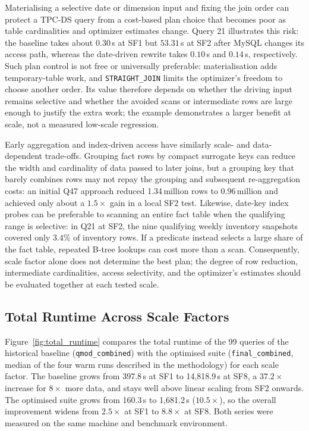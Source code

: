 \documentclass{ULBreport}
\begin{document}
Materialising a selective date or dimension input and fixing the join order can protect a TPC-DS query from a cost-based plan choice that becomes poor as table cardinalities and optimizer estimates change. Query 21 illustrates this risk: the baseline takes about $0.30$\,s at SF1 but $53.31$\,s at SF2 after MySQL changes its access path, whereas the date-driven rewrite takes $0.10$\,s and $0.14$\,s, respectively. Such plan control is not free or universally preferable: materialisation adds temporary-table work, and \texttt{STRAIGHT\_JOIN} limits the optimizer's freedom to choose another order. Its value therefore depends on whether the driving input remains selective and whether the avoided scans or intermediate rows are large enough to justify the extra work; the example demonstrates a larger benefit at scale, not a measured low-scale regression.

Early aggregation and index-driven access have similarly scale- and data-dependent trade-offs. Grouping fact rows by compact surrogate keys can reduce the width and cardinality of data passed to later joins, but a grouping key that barely combines rows may not repay the grouping and subsequent re-aggregation costs: an initial Q47 approach reduced 1.34\,million rows to 0.96\,million and achieved only about a $1.5\times$ gain in a local SF2 test. Likewise, date-key index probes can be preferable to scanning an entire fact table when the qualifying range is selective: in Q21 at SF2, the nine qualifying weekly inventory snapshots covered only $3.4\%$ of inventory rows. If a predicate instead selects a large share of the fact table, repeated B-tree lookups can cost more than a scan. Consequently, scale factor alone does not determine the best plan; the degree of row reduction, intermediate cardinalities, access selectivity, and the optimizer's estimates should be evaluated together at each tested scale.

\subsection{Total Runtime Across Scale Factors}

Figure~\ref{fig:total_runtime} compares the total runtime of the 99 queries of the historical baseline (\texttt{qmod\_combined}) with the optimised suite (\texttt{final\_combined}, median of the four warm runs described in the methodology) for each scale factor. The baseline grows from 397.8\,s at SF1 to 14,818.9\,s at SF8, a $37.2\times$ increase for $8\times$ more data, and stays well above linear scaling from SF2 onwards. The optimised suite grows from 160.3\,s to 1,681.2\,s ($10.5\times$), so the overall improvement widens from $2.5\times$ at SF1 to $8.8\times$ at SF8. Both series were measured on the same machine and benchmark environment.
\end{document}
